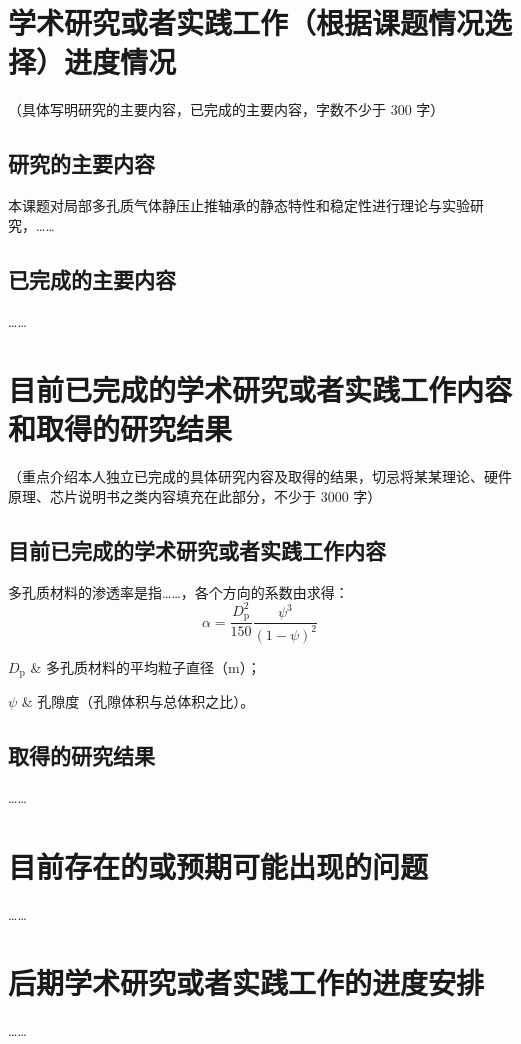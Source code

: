 
\section{学术研究或者实践工作（根据课题情况选择）进度情况}

（具体写明研究的主要内容，已完成的主要内容，字数不少于 300 字）

\subsection{研究的主要内容}

本课题对局部多孔质气体静压止推轴承的静态特性和稳定性进行理论与实验研究，……

\subsection{已完成的主要内容}

……

\section{目前已完成的学术研究或者实践工作内容和取得的研究结果}

（重点介绍本人独立已完成的具体研究内容及取得的结果，切忌将某某理论、硬件原理、芯片说明书之类内容填充在此部分，不少于 3000 字）

\subsection{目前已完成的学术研究或者实践工作内容}

多孔质材料的渗透率是指……，各个方向的系数由求得\cite{chen1992}：
\begin{equation}\label{eq:int-1}
  \alpha = \frac{D_{\mathrm{p}}^2}{150}\frac{\psi^3}{(1-\psi)^2}
\end{equation}
\begin{eqdenote}
  \item $D_{\mathrm{p}}$ & 多孔质材料的平均粒子直径（m）；
  \item $\psi$ & 孔隙度（孔隙体积与总体积之比）。
\end{eqdenote}

\subsection{取得的研究结果}

……

\section{目前存在的或预期可能出现的问题}

……

\section{后期学术研究或者实践工作的进度安排}

……

